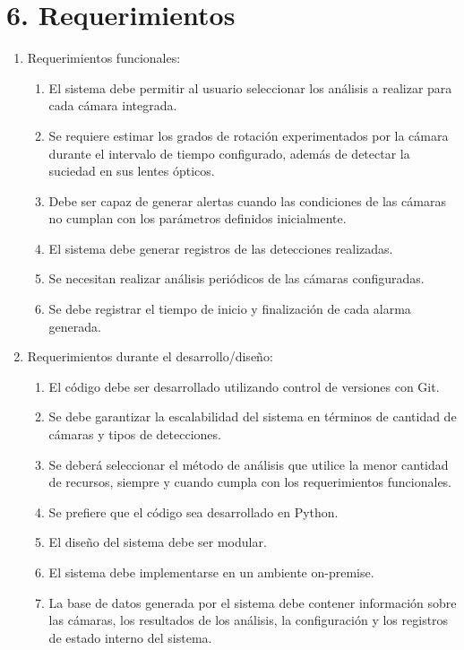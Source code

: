 \documentclass[
11pt, %
]{charter}
\begin{document}
\section{6. Requerimientos}
\label{sec:requerimientos}

\begin{enumerate}
	\item Requerimientos funcionales:
		\begin{enumerate}
			\item El sistema debe permitir al usuario seleccionar los análisis a realizar para cada cámara integrada.
			\item Se requiere estimar los grados de rotación experimentados por la cámara durante el intervalo de tiempo configurado, además de detectar la suciedad en sus lentes ópticos.
			\item Debe ser capaz de generar alertas cuando las condiciones de las cámaras no cumplan con los parámetros definidos inicialmente.
			\item El sistema debe generar registros de las detecciones realizadas.
			\item Se necesitan realizar análisis periódicos de las cámaras configuradas.
			\item Se debe registrar el tiempo de inicio y finalización de cada alarma generada.
		\end{enumerate}
	\item Requerimientos durante el desarrollo/diseño:
		\begin{enumerate}
			\item El código debe ser desarrollado utilizando control de versiones con Git.
			\item Se debe garantizar la escalabilidad del sistema en términos de cantidad de cámaras y tipos de detecciones.
			\item Se deberá seleccionar el método de análisis que utilice la menor cantidad de recursos, siempre y cuando cumpla con los requerimientos funcionales.
			\item Se prefiere que el código sea desarrollado en Python.
			\item El diseño del sistema debe ser modular.
			\item El sistema debe implementarse en un ambiente on-premise.
			\item La base de datos generada por el sistema debe contener información sobre las cámaras, los resultados de los análisis, la configuración y los registros de estado interno del sistema.
		\end{enumerate}

\end{enumerate}
\end{document}
